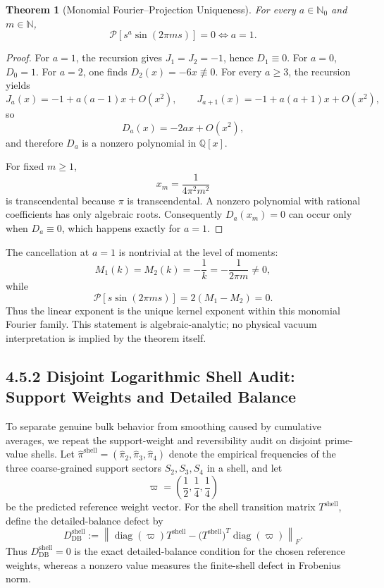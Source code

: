 \documentclass{article}
\newtheorem{theorem}{Theorem}[section]
\begin{document}
\begin{theorem}[Monomial Fourier--Projection Uniqueness]
For every $a\in\mathbb N_0$ and $m\in\mathbb N$,
\[
\boxed{\mathcal P\!\left[s^a\sin(2\pi m s)\right]=0\iff a=1.}
\]
\end{theorem}

\begin{proof}
For $a=1$, the recursion gives $J_1=J_2=-1$, hence $D_1\equiv0$.
For $a=0$, $D_0=1$. For $a=2$, one finds $D_2(x)=-6x\not\equiv0$.
For every $a\ge3$, the recursion yields
\[
J_a(x)=-1+a(a-1)x+O(x^2),
\qquad
J_{a+1}(x)=-1+a(a+1)x+O(x^2),
\]
so
\[
D_a(x)=-2ax+O(x^2),
\]
and therefore $D_a$ is a nonzero polynomial in $\mathbb Q[x]$.

For fixed $m\ge1$,
\[
x_m=\frac1{4\pi^2m^2}
\]
is transcendental because $\pi$ is transcendental. A nonzero polynomial with rational coefficients has only algebraic roots. Consequently $D_a(x_m)=0$ can occur only when $D_a\equiv0$, which happens exactly for $a=1$.
\end{proof}

The cancellation at $a=1$ is nontrivial at the level of moments:
\[
M_1(k)=M_2(k)=-\frac1k=-\frac1{2\pi m}\neq0,
\]
while
\[
\mathcal P[s\sin(2\pi m s)]=2(M_1-M_2)=0.
\]
Thus the linear exponent is the unique kernel exponent within this monomial Fourier family. This statement is algebraic-analytic; no physical vacuum interpretation is implied by the theorem itself.



\subsection*{4.5.2 Disjoint Logarithmic Shell Audit: Support Weights and Detailed Balance}

To separate genuine bulk behavior from smoothing caused by cumulative averages, we
repeat the support-weight and reversibility audit on disjoint prime-value shells.  Let
\(\widehat\pi^{\mathrm{shell}}=(\widehat\pi_2,\widehat\pi_3,\widehat\pi_4)\)
denote the empirical frequencies of the three coarse-grained support sectors
\(S_2,S_3,S_4\) in a shell, and let
\[
\varpi=\left(\frac12,\frac14,\frac14\right)
\]
be the predicted reference weight vector.  For the shell transition matrix
\(T^{\mathrm{shell}}\), define the detailed-balance defect by
\begin{equation}
D_{\mathrm{DB}}^{\mathrm{shell}}
:=
\left\|
\operatorname{diag}(\varpi)T^{\mathrm{shell}}
-
\bigl(T^{\mathrm{shell}}\bigr)^{\!T}\operatorname{diag}(\varpi)
\right\|_F .
\end{equation}
Thus \(D_{\mathrm{DB}}^{\mathrm{shell}}=0\) is the exact detailed-balance condition
for the chosen reference weights, whereas a nonzero value measures the finite-shell
defect in Frobenius norm.
\end{document}
